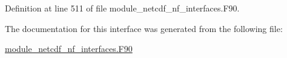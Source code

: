 Definition at line 511 of file module\+\_\+netcdf\+\_\+nf\+\_\+interfaces.\+F90.



The documentation for this interface was generated from the following file\+:\begin{DoxyCompactItemize}
\item 
\hyperlink{module__netcdf__nf__interfaces_8F90}{module\+\_\+netcdf\+\_\+nf\+\_\+interfaces.\+F90}\end{DoxyCompactItemize}
